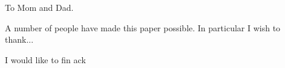 
\begin{dedication}
    To Mom and Dad.
\end{dedication}

\begin{acknowledgments}
     A number of people have made this paper possible.
     In particular
     I wish to thank...

    I would like to fin ack
\end{acknowledgments}

\tableofcontents
\listoftables
\listoffigures




